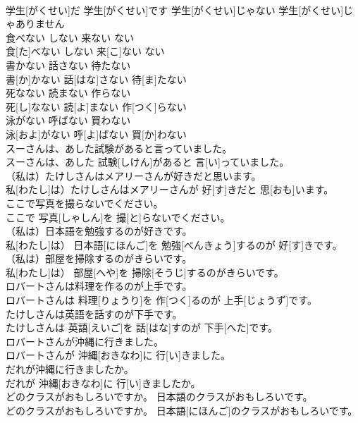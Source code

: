 \documentclass[8pt]{extreport}
\begin{document}
\begin{CJK}{UTF8}{min}
\\	学生[がくせい]だ 学生[がくせい]です 学生[がくせい]じゃない 学生[がくせい]じゃありません	
\\	食べない しない 来ない ない	
\\	食[た]べない しない 来[こ]ない ない	
\\	書かない 話さない 待たない	
\\	書[か]かない 話[はな]さない 待[ま]たない	
\\	死なない 読まない 作らない	
\\	死[し]なない 読[よ]まない 作[つく]らない	
\\	泳がない 呼ばない 買わない	
\\	泳[およ]がない 呼[よ]ばない 買[か]わない	
\\	スーさんは、あした試験があると言っていました。	
\\	スーさんは、あした 試験[しけん]があると 言[い]っていました。	
\\	（私は）たけしさんはメアリーさんが好きだと思います。	
\\	私[わたし]は）たけしさんはメアリーさんが 好[す]きだと 思[おも]います。	
\\	ここで写真を撮らないでください。	
\\	ここで 写真[しゃしん]を 撮[と]らないでください。	
\\	（私は）日本語を勉強するのが好きです。	
\\	私[わたし]は） 日本語[にほんご]を 勉強[べんきょう]するのが 好[す]きです。	
\\	（私は）部屋を掃除するのがきらいです。	
\\	私[わたし]は） 部屋[へや]を 掃除[そうじ]するのがきらいです。	
\\	ロバートさんは料理を作るのが上手です。	
\\	ロバートさんは 料理[りょうり]を 作[つく]るのが 上手[じょうず]です。	
\\	たけしさんは英語を話すのが下手です。	
\\	たけしさんは 英語[えいご]を 話[はな]すのが 下手[へた]です。	
\\	ロバートさんが沖縄に行きました。	
\\	ロバートさんが 沖縄[おきなわ]に 行[い]きました。	
\\	だれが沖縄に行きましたか。	
\\	だれが 沖縄[おきなわ]に 行[い]きましたか。	
\\	どのクラスがおもしろいですか。 日本語のクラスがおもしろいです。	
\\	どのクラスがおもしろいですか。 日本語[にほんご]のクラスがおもしろいです。	

\end{CJK}
\end{document}
